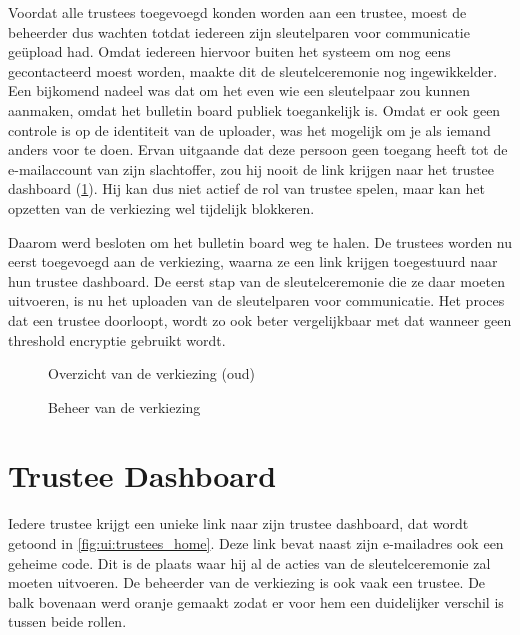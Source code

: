 \npar Voordat alle trustees toegevoegd konden worden aan een trustee, moest de beheerder dus wachten totdat iedereen zijn sleutelparen voor communicatie ge\"upload had. Omdat iedereen hiervoor buiten het systeem om nog eens gecontacteerd moest worden, maakte dit de sleutelceremonie nog ingewikkelder. Een bijkomend nadeel was dat om het even wie een sleutelpaar zou kunnen aanmaken, omdat het bulletin board publiek toegankelijk is. Omdat er ook geen controle is op de identiteit van de uploader, was het mogelijk om je als iemand anders voor te doen. Ervan uitgaande dat deze persoon geen toegang heeft tot de e-mailaccount van zijn slachtoffer, zou hij nooit de link krijgen naar het trustee dashboard (\ref{sec:ui:trustee_dashboard}). Hij kan dus niet actief de rol van trustee spelen, maar kan het opzetten van de verkiezing wel tijdelijk blokkeren.

\npar Daarom werd besloten om het bulletin board weg te halen. De trustees worden nu eerst toegevoegd aan de verkiezing, waarna ze een link krijgen toegestuurd naar hun trustee dashboard. De eerst stap van de sleutelceremonie die ze daar moeten uitvoeren, is nu het uploaden van de sleutelparen voor communicatie. Het proces dat een trustee doorloopt, wordt zo ook beter vergelijkbaar met dat wanneer geen threshold encryptie gebruikt wordt.

\begin{figure}
  \caption{Overzicht van de verkiezing (oud)}
  \label{fig:ui:elections_view_old}
\end{figure}

\begin{figure}
  \caption{Beheer van de verkiezing}
  \label{fig:ui:elections_admin}
\end{figure}

\section{Trustee Dashboard}
\label{sec:ui:trustee_dashboard}

Iedere trustee krijgt een unieke link naar zijn trustee dashboard, dat wordt getoond in \ref{fig:ui:trustees_home}. Deze link bevat naast zijn e-mailadres ook een geheime code. Dit is de plaats waar hij al de acties van de sleutelceremonie zal moeten uitvoeren. De beheerder van de verkiezing is ook vaak een trustee. De balk bovenaan werd oranje gemaakt zodat er voor hem een duidelijker verschil is tussen beide rollen.

